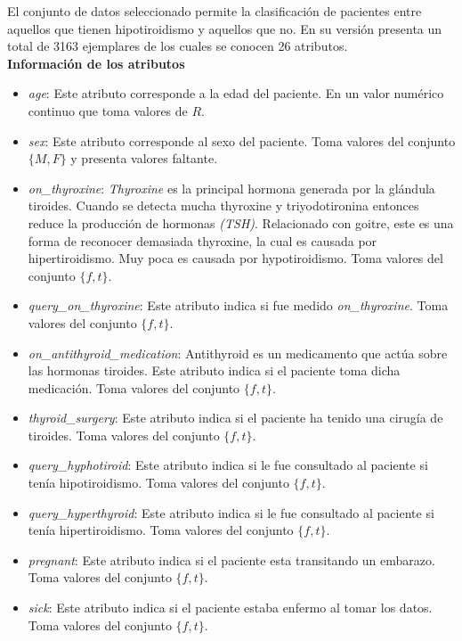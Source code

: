 \documentclass[osajnl,twocolumn,showpacs,superscriptaddress,10pt,floatfix]{revtex4-1} %
\begin{document}
El conjunto de datos seleccionado permite la clasificación de pacientes entre aquellos que tienen hipotiroidismo y aquellos que no. En su versión presenta un total de 3163 ejemplares de los cuales se conocen 26 atributos. \\

\textbf{Información de los atributos}

\begin{itemize}
    \item \textit{age}: Este atributo corresponde a la edad del paciente. En un valor numérico continuo que toma valores de $R$.
    \item \textit{sex}: Este atributo corresponde al sexo del paciente. Toma valores del conjunto $\{M, F\}$ y presenta valores faltante.
    \item \textit{on\_thyroxine}:  \textit{Thyroxine} es la principal hormona generada por la glándula tiroides. Cuando se detecta mucha thyroxine y triyodotironina entonces reduce la producción de hormonas \textit{(TSH)}. Relacionado con goitre, este es una forma de reconocer demasiada thyroxine, la cual es causada por hipertiroidismo. Muy poca es causada por hypotiroidismo. Toma valores del conjunto $\{f, t\}$.
    \item \textit{query\_on\_thyroxine}: Este atributo indica si fue medido \textit{on\_thyroxine}. Toma valores del conjunto $\{f, t\}$.
    \item \textit{on\_antithyroid\_medication}: Antithyroid es un medicamento que actúa sobre las hormonas tiroides. Este atributo indica si el paciente toma dicha medicación. Toma valores del conjunto $\{f, t\}$.
    \item \textit{thyroid\_surgery}: Este atributo indica si el paciente ha tenido una cirugía de tiroides. Toma valores del conjunto $\{f, t\}$.
    \item \textit{query\_hyphotiroid}: Este atributo indica si le fue consultado al paciente si tenía hipotiroidismo. Toma valores del conjunto $\{f, t\}$.
    \item \textit{query\_hyperthyroid}: Este atributo indica si le fue consultado al paciente si tenía hipertiroidismo. Toma valores del conjunto $\{f, t\}$.
    \item \textit{pregnant}: Este atributo indica si el paciente esta transitando un embarazo. Toma valores del conjunto $\{f, t\}$.
    \item \textit{sick}: Este atributo indica si el paciente estaba enfermo al tomar los datos. Toma valores del conjunto $\{f, t\}$.

\end{itemize}
\end{document}

